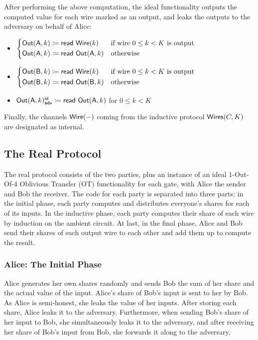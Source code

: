 \noindent After performing the above computation, the ideal functionality outputs the computed value for each wire marked as an output, and leaks the outputs to the adversary on behalf of Alice:

\begin{itemize}
\item $\begin{cases*} \Out(\A,k) \coloneqq \read{\Wire(k)} & \text{if wire $0 \leq k < K$ is output} \\ \Out(\A,k) \coloneqq \read{\Out(\A,k)} & \text{otherwise} \end{cases*}$
\item $\begin{cases*} \Out(\B,k) \coloneqq \read{\Wire(k)} & \text{if wire $0 \leq k < K$ is output} \\ \Out(\B,k) \coloneqq \read{\Out(\B,k)} & \text{otherwise} \end{cases*}$
\item {\color{blue} $\mathsf{Out}(\mathsf{A},k)^{\mathsf{id}}_{\mathsf{adv}} \coloneqq \mathsf{read} \ \mathsf{Out}(\mathsf{A},k)$ for $0 \leq k < K$}
\end{itemize}

\noindent Finally, the channels $\mathsf{Wire}(-)$ coming from the inductive protocol $\mathsf{Wires}(C,K)$ are designated as internal.

\subsection{The Real Protocol}
The real protocol consists of the two parties, plus an instance of an ideal 1-Out-Of-4 Oblivious Transfer (OT) functionality for each gate, with Alice the sender and Bob the receiver. The code for each party is separated into three parts: in the initial phase, each party computes and distributes everyone's shares for each of its inputs. In the inductive phase, each party computes their share of each wire by induction on the ambient circuit. At last, in the final phase, Alice and Bob send their shares of each output wire to each other and add them up to compute the result.

\subsubsection{Alice: The Initial Phase}
Alice generates her own shares randomly and sends Bob the sum of her share and the actual value of the input. Alice's share of Bob's input is sent to her by Bob. As Alice is semi-honest, she leaks the value of her inputs. After storing each share, Alice leaks it to the adversary. Furthermore, when sending Bob's share of her input to Bob, she simultaneously leaks it to the adversary, and after receiving her share of Bob's input from Bob, she forwards it along to the adversary.

